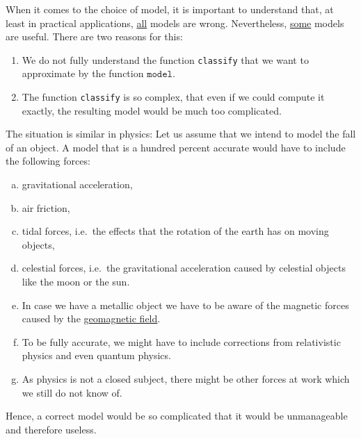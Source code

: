 When it comes to the choice of model, it is important to understand that, at least in practical applications,
\underline{all} models are wrong.  Nevertheless, \underline{some} models are useful.  There are two reasons for this:
\begin{enumerate}
\item We do not fully understand the function \texttt{classify} that we want to approximate by the function $\mathtt{model}$.
\item The function \texttt{classify} is so complex, that even if we could compute it exactly, the resulting model 
      would be much too complicated.
\end{enumerate}
The situation is similar in physics: Let us assume that we intend to model the fall of an object.  A model that is a
hundred percent accurate would have to include the following forces:
\begin{enumerate}[(a)]
\item gravitational acceleration,
\item air friction, 
\item tidal forces, i.e.~the effects that the rotation of the earth has on moving objects,
\item celestial forces, i.e.~the gravitational acceleration caused by celestial objects like the moon or the
      sun.
\item In case we have a metallic object we have to be aware of the magnetic forces
      caused by the \href{https://www.britannica.com/science/geomagnetic-field}{geomagnetic field}.
\item To be fully accurate, we might have to include corrections from relativistic physics and even quantum
      physics.   
\item As physics is not a closed subject, there might be other forces at work which we still do not know of. 
\end{enumerate}
Hence, a correct model would be so complicated that it would be unmanageable and therefore useless. 

